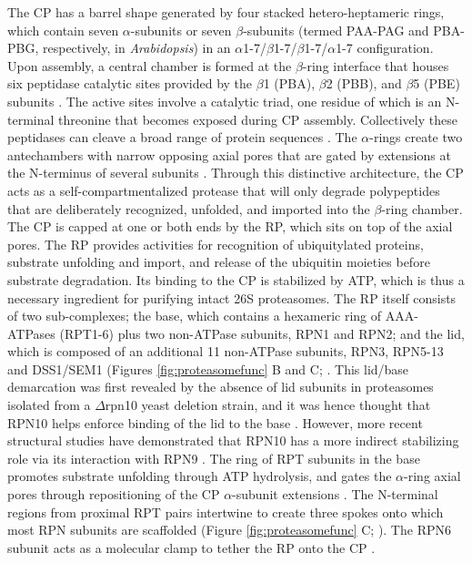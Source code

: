 	 The CP has a barrel shape generated by four stacked hetero-heptameric rings, which contain seven $\alpha$-subunits or seven $\beta$-subunits (termed PAA-PAG and PBA-PBG, respectively, in \textit{Arabidopsis}) in an $\alpha$1-7/$\beta$1-7/$\beta$1-7/$\alpha$1-7 configuration.  Upon assembly, a central chamber is formed at the $\beta$-ring interface that houses six peptidase catalytic sites provided by the $\beta$1 (PBA), $\beta$2 (PBB), and $\beta$5 (PBE) subunits \citep{arendt97, heinemeyer97}.  The active sites involve a catalytic triad, one residue of which is an N-terminal threonine that becomes exposed during CP assembly.  Collectively these peptidases can cleave a broad range of protein sequences \citep{arendt97, groll99}.  The $\alpha$-rings create two antechambers with narrow opposing axial pores that are gated by extensions at the N-terminus of several subunits \citep{groll00, ruschak10}.  Through this distinctive architecture, the CP acts as a self-compartmentalized protease that will only degrade polypeptides that are deliberately recognized, unfolded, and imported into the $\beta$-ring chamber. 
The CP is capped at one or both ends by the RP, which sits on top of the axial pores.  The RP provides activities for recognition of ubiquitylated proteins, substrate unfolding and import, and release of the ubiquitin moieties before substrate degradation.  Its binding to the CP is stabilized by ATP, which is thus a necessary ingredient for purifying intact 26S proteasomes.  The RP itself consists of two sub-complexes; the base, which contains a hexameric ring of AAA-ATPases (RPT1-6) plus two non-ATPase subunits, RPN1 and RPN2; and the lid, which is composed of an additional 11 non-ATPase subunits, RPN3, RPN5-13 and DSS1/SEM1 (Figures \ref{fig:proteasomefunc} B and C; \citep{bhattacharyya14, book10, finley09, glickman98-c8Wsa, russell13}.  This lid/base demarcation was first revealed by the absence of lid subunits in proteasomes isolated from a $\Delta$rpn10 yeast deletion strain, and it was hence thought that RPN10 helps enforce binding of the lid to the base \citep{glickman98}.  However, more recent structural studies have demonstrated that RPN10 has a more indirect stabilizing role via its interaction with RPN9 \citep{lander12}.  The ring of RPT subunits in the base promotes substrate unfolding through ATP hydrolysis, and gates the $\alpha$-ring axial pores through repositioning of the CP $\alpha$-subunit extensions \citep{köhler01, rabl08, smith05}.  The N-terminal regions from proximal RPT pairs intertwine to create three spokes onto which most RPN subunits are scaffolded (Figure \ref{fig:proteasomefunc} C; \citep{beck12}).  The RPN6 subunit acts as a molecular clamp to tether the RP onto the CP \citep{pathare12}. 
